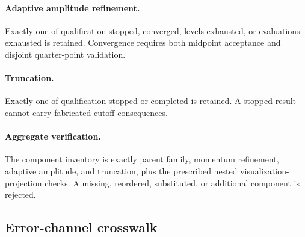 \paragraph{Adaptive amplitude refinement.}
Exactly one of qualification stopped, converged, levels exhausted, or evaluations
exhausted is retained.  Convergence requires both midpoint acceptance and disjoint
quarter-point validation.

\paragraph{Truncation.}
Exactly one of qualification stopped or completed is retained.  A stopped result cannot
carry fabricated cutoff consequences.

\paragraph{Aggregate verification.}
The component inventory is exactly parent family, momentum refinement, adaptive
amplitude, and truncation, plus the prescribed nested visualization-projection checks.
A missing, reordered, substituted, or additional component is rejected.

\subsection{Error-channel crosswalk}

